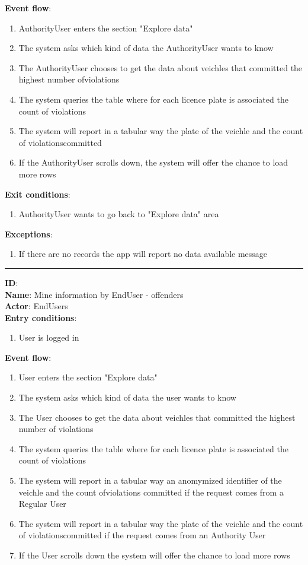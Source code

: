	\textbf{Event flow}:
	\begin{enumerate}
		\item{AuthorityUser enters the section "Explore data"}
		\item{The system asks which kind of data the AuthorityUser wants to know}
    \item{The AuthorityUser chooses to get the data about veichles that committed the highest number ofviolations}
    \item{The system queries the table where for each licence plate is associated the count of violations }
    \item{The system will report in a tabular way the plate of the veichle and the count of violationscommitted}
    \item{If the AuthorityUser scrolls down, the system will offer the chance to load more rows}
	\end{enumerate}
	\textbf{Exit conditions}:
  \begin{enumerate}
    \item{AuthorityUser wants to go back to "Explore data" area}
  \end{enumerate}
	\textbf{Exceptions}:
	\begin{enumerate}
		\item{If there are no records the app will report no data available message}
	\end{enumerate}
	\rule{\linewidth}{0.4pt}
  \textbf{ID}:  \\
  \textbf{Name}: Mine information by EndUser - offenders \\
  \textbf{Actor}: EndUsers   \\
  \textbf{Entry conditions}:
  \begin{enumerate}
    \item{User is logged in}
  \end{enumerate}
  \textbf{Event flow}:
  \begin{enumerate}
    \item{User enters the section "Explore data"}
    \item{The system asks which kind of data the user wants to know}
    \item{The User chooses to get the data about veichles that committed the highest number of violations}
    \item{The system queries the table where for each licence plate is associated the count of violations }
    \item{The system will report in a tabular way an anomymized identifier of the veichle and the count ofviolations committed if the request comes from a Regular User}
    \item{The system will report in a tabular way the plate of the veichle and the count of violationscommitted if the request comes from an Authority User}
    \item{If the User scrolls down the system will offer the chance to load more rows}
  \end{enumerate}
